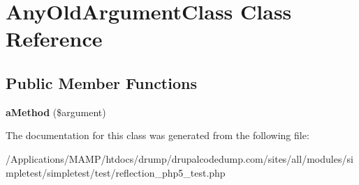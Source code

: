 \hypertarget{class_any_old_argument_class}{
\section{AnyOldArgumentClass Class Reference}
\label{class_any_old_argument_class}
}
\subsection*{Public Member Functions}
\begin{DoxyCompactItemize}
\item 
\hypertarget{class_any_old_argument_class_a854c6856efcbb12c47e56d983f869c39}{
{\bfseries aMethod} (\$argument)}
\label{class_any_old_argument_class_a854c6856efcbb12c47e56d983f869c39}

\end{DoxyCompactItemize}


The documentation for this class was generated from the following file:\begin{DoxyCompactItemize}
\item 
/Applications/MAMP/htdocs/drump/drupalcodedump.com/sites/all/modules/simpletest/simpletest/test/reflection\_\-php5\_\-test.php\end{DoxyCompactItemize}
